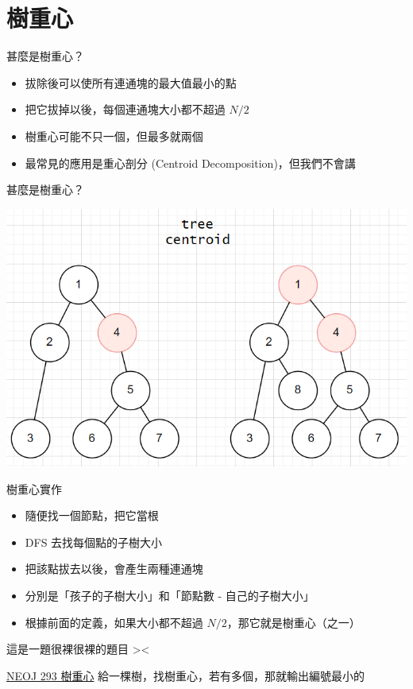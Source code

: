 \documentclass[aspectratio=169]{beamer}
\begin{document}
    \section{樹重心}
    \begin{frame}{甚麼是樹重心？}
        \begin{itemize}
            \item 拔除後可以使所有連通塊的最大值最小的點
            \item 把它拔掉以後，每個連通塊大小都不超過 $N/2$ 
            \item 樹重心可能不只一個，但最多就兩個
            \item 最常見的應用是重心剖分 (Centroid Decomposition)，但我們不會講
        \end{itemize}
    \end{frame}
    \begin{frame}{甚麼是樹重心？}
        \begin{center}
            \includegraphics[scale=0.7]{images/tree_centroid.png}
        \end{center}
    \end{frame}
    \begin{frame}{樹重心實作}
        \begin{itemize}
            \item 隨便找一個節點，把它當根
            \item DFS 去找每個點的子樹大小
            \item<2-> 把該點拔去以後，會產生兩種連通塊
            \item<2-> 分別是「孩子的子樹大小」和「節點數 - 自己的子樹大小」
            \item<3-> 根據前面的定義，如果大小都不超過 $N/2$，那它就是樹重心（之一）
        \end{itemize}
    \end{frame}
    \begin{frame}{這是一題很裸很裸的題目 ><}
        \begin{block}{\href{https://neoj.sprout.tw/problem/293/}{NEOJ 293 樹重心}}
        給一棵樹，找樹重心，若有多個，那就輸出編號最小的
        \end{block}
    \end{frame}
    
\end{document}
